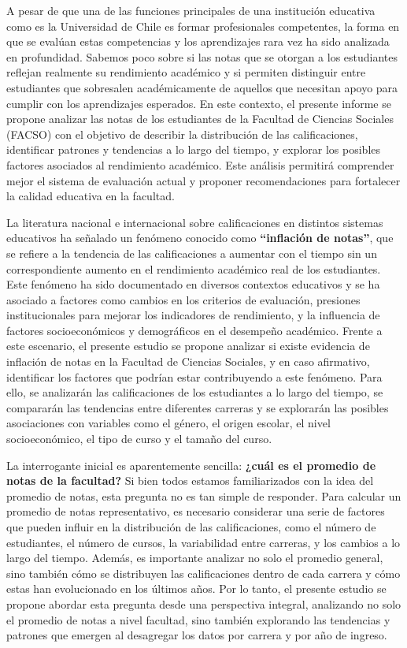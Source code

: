 \documentclass[
  spanish,
  a4paper,
  oneside]{scrbook}
\begin{document}
A pesar de que una de las funciones principales de una institución
educativa como es la Universidad de Chile es formar profesionales
competentes, la forma en que se evalúan estas competencias y los
aprendizajes rara vez ha sido analizada en profundidad. Sabemos poco
sobre si las notas que se otorgan a los estudiantes reflejan realmente
su rendimiento académico y si permiten distinguir entre estudiantes que
sobresalen académicamente de aquellos que necesitan apoyo para cumplir
con los aprendizajes esperados. En este contexto, el presente informe se
propone analizar las notas de los estudiantes de la Facultad de Ciencias
Sociales (FACSO) con el objetivo de describir la distribución de las
calificaciones, identificar patrones y tendencias a lo largo del tiempo,
y explorar los posibles factores asociados al rendimiento académico.
Este análisis permitirá comprender mejor el sistema de evaluación actual
y proponer recomendaciones para fortalecer la calidad educativa en la
facultad.

La literatura nacional e internacional sobre calificaciones en distintos
sistemas educativos ha señalado un fenómeno conocido como
\textbf{``inflación de notas''}, que se refiere a la tendencia de las
calificaciones a aumentar con el tiempo sin un correspondiente aumento
en el rendimiento académico real de los estudiantes. Este fenómeno ha
sido documentado en diversos contextos educativos y se ha asociado a
factores como cambios en los criterios de evaluación, presiones
institucionales para mejorar los indicadores de rendimiento, y la
influencia de factores socioeconómicos y demográficos en el desempeño
académico. Frente a este escenario, el presente estudio se propone
analizar si existe evidencia de inflación de notas en la Facultad de
Ciencias Sociales, y en caso afirmativo, identificar los factores que
podrían estar contribuyendo a este fenómeno. Para ello, se analizarán
las calificaciones de los estudiantes a lo largo del tiempo, se
compararán las tendencias entre diferentes carreras y se explorarán las
posibles asociaciones con variables como el género, el origen escolar,
el nivel socioeconómico, el tipo de curso y el tamaño del curso.

La interrogante inicial es aparentemente sencilla: \textbf{¿cuál es el
promedio de notas de la facultad?} Si bien todos estamos familiarizados
con la idea del promedio de notas, esta pregunta no es tan simple de
responder. Para calcular un promedio de notas representativo, es
necesario considerar una serie de factores que pueden influir en la
distribución de las calificaciones, como el número de estudiantes, el
número de cursos, la variabilidad entre carreras, y los cambios a lo
largo del tiempo. Además, es importante analizar no solo el promedio
general, sino también cómo se distribuyen las calificaciones dentro de
cada carrera y cómo estas han evolucionado en los últimos años. Por lo
tanto, el presente estudio se propone abordar esta pregunta desde una
perspectiva integral, analizando no solo el promedio de notas a nivel
facultad, sino también explorando las tendencias y patrones que emergen
al desagregar los datos por carrera y por año de ingreso.
\end{document}
